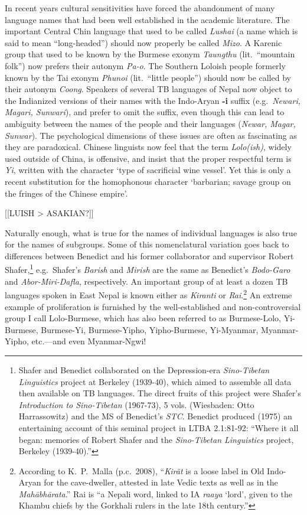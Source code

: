 \begin{itemize}
In recent years cultural sensitivities have forced the abandonment of many
language names that had been well established in the academic literature.  The
important Central Chin language that used to be called \textit{Lushai} (a name which is
said to mean “long-headed”) should now properly be called \textit{Mizo}.
A Karenic group
that used to be known by the Burmese exonym \textit{Taungthu} (lit.\ “mountain folk”) now
prefers their autonym \textit{Pa-o}.  The Southern Loloish people
formerly known by the Tai exonym \textit{Phunoi} (lit.\ “little people”) should now be
called by their autonym \textit{Coong}.  Speakers of several TB languages of Nepal now
object to the Indianized versions of their names with the Indo-Aryan \textbf{-i} suffix
(e.g.\ \textit{Newari, Magari, Sunwari}), and prefer to omit the suffix, even though this
can lead to ambiguity between the names of the people and their languages
(\textit{Newar, Magar, Sunwar}).  The psychological dimensions of these issues are often
as fascinating as they are paradoxical.  Chinese linguists now feel that the
term \textit{Lolo(ish)}, widely used outside of China,
is offensive, and insist that the
proper respectful term is \textit{Yi}, written with the character  ‘type of
sacrificial wine vessel’.  Yet this is only a recent substitution for the
homophonous character  ‘barbarian; savage group on the fringes of the Chinese
empire’.

[[LUISH > ASAKIAN?]]


Naturally enough, what is true for the names of individual languages is also
true for the names of subgroups.  Some of this nomenclatural variation goes back
to differences between Benedict and his former collaborator and supervisor
Robert Shafer,\footnote{Shafer and Benedict collaborated on the Depression-era
\textit{Sino-Tibetan Linguistics} project at Berkeley (1939-40), which aimed to assemble
all data then available on TB languages.  The direct fruits of this project were
Shafer’s \textit{Introduction to Sino-Tibetan} (1967-73), 5 vols. (Wiesbaden: Otto
Harrassowitz) and the MS of Benedict’s \textit{STC}.  Benedict produced (1975) an
entertaining account of this seminal project in LTBA 2.1:81-92: “Where it all
began: memories of Robert Shafer and the \textit{Sino-Tibetan Linguistics} project,
Berkeley (1939-40).”} e.g.\ Shafer’s \textit{Barish} and \textit{Mirish} are the same as Benedict’s
\textit{Bodo-Garo} and \textit{Abor-Miri-Dafla}, respectively.  An important group of at least a
dozen TB languages spoken in East Nepal is known either as \textit{Kiranti} or
\textit{Rai}.\footnote{According to K.~P.~Malla (p.c.~2008), “\textit{Kirãt} is a loose label in Old Indo-Aryan for the cave-dweller, attested in late Vedic texts as well as in the \textit{Mahābhārata}.” Rai is “a Nepali word, linked to IA \textit{raaya} ‘lord’, given to the Khambu chiefs by the Gorkhali rulers in the late 18th century.”}
  An extreme example of proliferation is furnished by the well-established and
non-controversial group I call Lolo-Burmese, which has also been referred to as
Burmese-Lolo, Yi-Burmese, Burmese-Yi, Burmese-Yipho, Yipho-Burmese, Yi-Myanmar,
Myanmar-Yipho, etc.—and even Myanmar-Ngwi!



\end{itemize}
